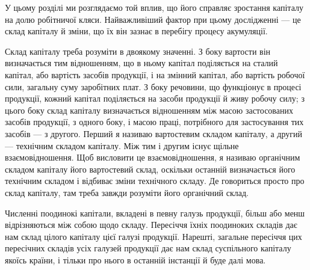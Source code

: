 У цьому розділі ми розглядаємо той вплив, що його справляє
зростання капіталу на долю робітничої кляси. Найважливіший
фактор при цьому дослідженні — це склад капіталу й зміни,
що їх він зазнає в перебігу процесу акумуляції.

Склад капіталу треба розуміти в двоякому значенні. З боку
вартости він визначається тим відношенням, що в ньому капітал
поділяється на сталий капітал, або вартість засобів продукції,
і на змінний капітал, або вартість робочої сили, загальну суму
заробітних плат. З боку речовини, що функціонує в процесі
продукції, кожний капітал поділяється на засоби продукції й
живу робочу силу; з цього боку склад капіталу визначається відношенням
між масою застосованих засобів продукції, з одного
боку, і масою праці, потрібного для застосування тих засобів —
з другого. Перший я називаю вартостевим складом капіталу, а
другий — технічним складом капіталу. Між тим і другим існує
щільне взаємовідношення. Щоб висловити це взаємовідношення,
я називаю органічним складом капіталу його вартостевий склад,
оскільки останній визначається його технічним складом і відбиває
зміни технічного складу. Де говориться просто про склад капіталу,
там треба завжди розуміти його органічний склад.

Численні поодинокі капітали, вкладені в певну галузь продукції,
більш або менш відрізняються між собою щодо складу.
Пересіччя їхніх поодиноких складів дає нам склад цілого капіталу
цієї галузі продукції. Нарешті, загальне пересіччя цих пересічних
складів усіх галузей продукції дає нам склад суспільного
капіталу якоїсь країни, і тільки про нього в останній інстанції
й буде далі мова.

